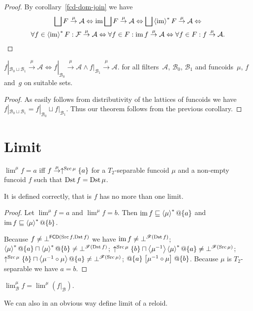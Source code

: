 \begin{proof}
By corollary~\ref{fcd-dom-join} we have
\begin{multline*}
\bigsqcup F\overset{\mu}{\rightarrow}\mathcal{A} \Leftrightarrow \im\bigsqcup F\overset{\mu}{\rightarrow}\mathcal{A} \Leftrightarrow
\bigsqcup\rsupfun{\im}F\overset{\mu}{\rightarrow}\mathcal{A} \Leftrightarrow \\
\forall f\in\rsupfun{\im}F:\mathcal{F}\overset{\mu}{\rightarrow}\mathcal{A} \Leftrightarrow
\forall f\in F:\im f\overset{\mu}{\rightarrow}\mathcal{A} \Leftrightarrow
\forall f\in F:f\overset{\mu}{\rightarrow}\mathcal{A}.
\end{multline*}
\end{proof}

\begin{thm}
$f|_{\mathcal{B}_0\sqcup\mathcal{B}_1}\overset{\mu}{\rightarrow}\mathcal{A} \Leftrightarrow
f|_{\mathcal{B}_0}\overset{\mu}{\rightarrow}\mathcal{A} \land f|_{\mathcal{B}_1}\overset{\mu}{\rightarrow}\mathcal{A}$.
for all filters~$\mathcal{A}$, $\mathcal{B}_0$, $\mathcal{B}_1$ and funcoids~$\mu$, $f$ and~$g$ on suitable sets.
\end{thm}

\begin{proof}
As easily follows from distributivity of the lattices of funcoids we have
$f|_{\mathcal{B}_0\sqcup\mathcal{B}_1} = f|_{\mathcal{B}_0}\sqcup f|_{\mathcal{B}_1}$.
Thus our theorem follows from the previous corollary.
\end{proof}

\section{Limit}
\begin{defn}
$\lim^{\mu}f=a$ iff $f\overset{\mu}{\rightarrow}\uparrow^{\operatorname{Src}\mu}\{a\}$
for a $T_{2}$-separable funcoid $\mu$ and a non-empty funcoid $f$
such that $\operatorname{Dst} f=\operatorname{Dst}\mu$.
\end{defn}
It is defined correctly, that is $f$ has no more than one limit.
\begin{proof}
Let $\lim^{\mu}f=a$ and $\lim^{\mu}f=b$. Then $\operatorname{im} f\sqsubseteq\left\langle \mu\right\rangle ^{\ast}@\{a\}$
and $\operatorname{im} f\sqsubseteq\left\langle \mu\right\rangle ^{\ast}@\{b\}$.

Because $f\ne\bot^{\mathsf{FCD}(\operatorname{Src} f,\operatorname{Dst} f)}$ we have $\operatorname{im} f\ne\bot^{\mathscr{F}(\operatorname{Dst} f)}$;
$\left\langle \mu\right\rangle ^{\ast}@\{a\}\sqcap\left\langle \mu\right\rangle ^{\ast}@\{b\}\ne\bot^{\mathscr{F}(\operatorname{Dst} f)}$;
$\uparrow^{\operatorname{Src}\mu}\{b\}\sqcap\left\langle \mu^{-1}\right\rangle\left\langle \mu\right\rangle ^{\ast}@\{a\}\ne\bot^{\mathscr{F}(\operatorname{Src}\mu)}$;
$\uparrow^{\Src\mu}\{b\}\sqcap\supfun{\mu^{-1}\circ\mu}@\{a\}\ne\bot^{\mathscr{F}(\Src\mu)}$;
$@\{a\}\mathrel{\left[\mu^{-1}\circ\mu\right]}@\{b\}$.
Because $\mu$ is $T_{2}$-separable we have $a=b$.\end{proof}
\begin{defn}
$\lim_{\mathcal{B}}^{\mu}f=\lim^{\mu}(f|_{\mathcal{B}})$.\end{defn}
\begin{rem}
We can also in an obvious way define limit of a reloid.
\end{rem}

